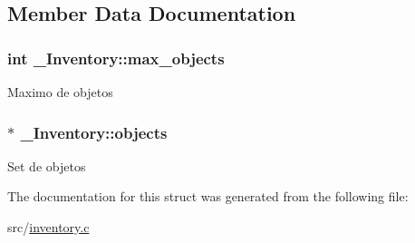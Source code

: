 \subsection{Member Data Documentation}
\hypertarget{struct__Inventory_a80b9762e443001b51fa4839ddf074a69}{
\subsubsection[{max\+\_\+objects}]{\setlength{\rightskip}{0pt plus 5cm}int \+\_\+\+Inventory\+::max\+\_\+objects}}\label{struct__Inventory_a80b9762e443001b51fa4839ddf074a69}
Maximo de objetos \hypertarget{struct__Inventory_a478e4b50a62b9e7d5b17e335319faa97}{
\subsubsection[{objects}]{$\ast$ \+\_\+\+Inventory\+::objects}}\label{struct__Inventory_a478e4b50a62b9e7d5b17e335319faa97}
Set de objetos 

The documentation for this struct was generated from the following file\+:\begin{DoxyCompactItemize}
\item 
src/\hyperlink{inventory_8c}{inventory.\+c}\end{DoxyCompactItemize}

